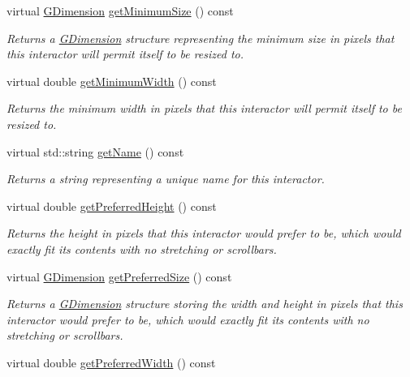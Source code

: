 \begin{DoxyCompactItemize}
virtual \mbox{\hyperlink{structsgl_1_1GDimension}{G\+Dimension}} \mbox{\hyperlink{classsgl_1_1GInteractor_a66b5af0b32493b4d597ca0a3df2049ea}{get\+Minimum\+Size}} () const
\begin{DoxyCompactList}\small\item\em Returns a \mbox{\hyperlink{structsgl_1_1GDimension}{G\+Dimension}} structure representing the minimum size in pixels that this interactor will permit itself to be resized to. \end{DoxyCompactList}\item 
virtual double \mbox{\hyperlink{classsgl_1_1GInteractor_a59e668114fe3d49d2a0f28deb258f7c8}{get\+Minimum\+Width}} () const
\begin{DoxyCompactList}\small\item\em Returns the minimum width in pixels that this interactor will permit itself to be resized to. \end{DoxyCompactList}\item 
virtual std\+::string \mbox{\hyperlink{classsgl_1_1GInteractor_a8a60438a5b55d0b2ceb35c8674b9d8c5}{get\+Name}} () const
\begin{DoxyCompactList}\small\item\em Returns a string representing a unique name for this interactor. \end{DoxyCompactList}\item 
virtual double \mbox{\hyperlink{classsgl_1_1GInteractor_a747de0961653847bdc6615dbf756d715}{get\+Preferred\+Height}} () const
\begin{DoxyCompactList}\small\item\em Returns the height in pixels that this interactor would prefer to be, which would exactly fit its contents with no stretching or scrollbars. \end{DoxyCompactList}\item 
virtual \mbox{\hyperlink{structsgl_1_1GDimension}{G\+Dimension}} \mbox{\hyperlink{classsgl_1_1GInteractor_a4aabbee761d8e9116275401131b7ccd1}{get\+Preferred\+Size}} () const
\begin{DoxyCompactList}\small\item\em Returns a \mbox{\hyperlink{structsgl_1_1GDimension}{G\+Dimension}} structure storing the width and height in pixels that this interactor would prefer to be, which would exactly fit its contents with no stretching or scrollbars. \end{DoxyCompactList}\item 
virtual double \mbox{\hyperlink{classsgl_1_1GInteractor_a82bca31d37700fb0e35d2743352efd5e}{get\+Preferred\+Width}} () const

\end{DoxyCompactItemize}

